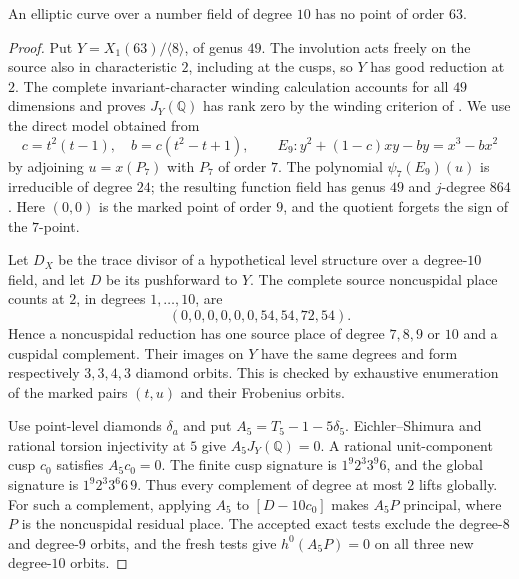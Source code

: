 \begin{proposition}\label{prop:decic-no63}
An elliptic curve over a number field of degree $10$ has no point
of order $63$.
\end{proposition}
\begin{proof}
Put $Y=X_1(63)/\langle8\rangle$, of genus $49$.
The involution acts freely on the source also in characteristic
$2$, including at the cusps, so $Y$ has good reduction at $2$.
The complete invariant-character winding calculation accounts for
all $49$ dimensions and proves $J_Y(\mathbb Q)$ has rank zero
by the winding criterion of \cite[Section~3]{DEHMZ}.
We use the direct model obtained from
\[
 c=t^2(t-1),\quad b=c(t^2-t+1),\qquad
 E_9:y^2+(1-c)xy-by=x^3-bx^2
\]
by adjoining $u=x(P_7)$ with $P_7$ of order $7$.
The polynomial $\psi_7(E_9)(u)$ is irreducible of degree $24$;
the resulting function field has genus $49$ and $j$-degree $864$.
Here $(0,0)$ is the marked point of order $9$, and the quotient
forgets the sign of the $7$-point.

Let $D_X$ be the trace divisor of a hypothetical level structure
over a degree-$10$ field, and let $D$ be its pushforward to $Y$.
The complete source noncuspidal place counts at $2$, in degrees
$1,\ldots,10$, are
\[
                    (0,0,0,0,0,0,54,54,72,54).
\]
Hence a noncuspidal reduction has one source place of degree
$7,8,9$ or $10$ and a cuspidal complement.
Their images on $Y$ have the same degrees and form respectively
$3,3,4,3$ diamond orbits. This is checked by exhaustive enumeration
of the marked pairs $(t,u)$ and their Frobenius orbits.

Use point-level diamonds $\delta_a$ and put
$A_5=T_5-1-5\delta_5$. Eichler--Shimura and rational torsion
injectivity at $5$ give $A_5J_Y(\mathbb Q)=0$.
A rational unit-component cusp $c_0$ satisfies $A_5c_0=0$.
The finite cusp signature is $1^9 2^3 3^9 6$, and the global
signature is $1^9 2^3 3^6 6\,9$.
Thus every complement of degree at most $2$ lifts globally.
For such a complement, applying $A_5$ to $[D-10c_0]$ makes
$A_5P$ principal, where $P$ is the noncuspidal residual place.
The accepted exact tests exclude the degree-$8$ and degree-$9$
orbits, and the fresh tests give $h^0(A_5P)=0$ on all three
new degree-$10$ orbits.


\end{proof}
